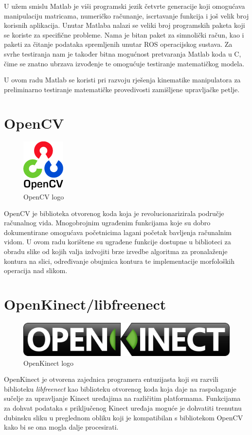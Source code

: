 \documentclass[times, utf8, diplomski, numeric]{fer}
\begin{document}
U užem smislu Matlab je viši programski jezik četvrte generacije koji omogućava manipulaciju matricama, numeričko računanje, iscrtavanje funkcija i još velik broj korisnih aplikacija.
Unutar Matlaba nalazi se veliki broj programskih paketa koji se koriste za specifične probleme.
Nama je bitan paket za simnolički račun, kao i paketi za čitanje podataka spremljenih unutar ROS operacijskog sustava.
Za svrhe testiranja nam je također bitna mogućnost pretvaranja Matlab koda u C, čime se znatno ubrzava izvođenje te omogućuje testiranje matematičkog modela.

U ovom radu Matlab se koristi pri razvoju rješenja kinematike manipulatora za preliminarno testiranje matematičke provedivosti zamišljene upravljačke petlje.

\section{OpenCV}
\begin{figure}[h!]
\centering
\includegraphics[scale=0.6]{logo_opencv}
\caption{OpenCV logo}
\end{figure}
OpenCV je biblioteka otvorenog koda koja je revolucionarizirala područje računalnog vida. Mnogobrojnim ugrađenim funkcijama koje su dobro dokumentirane omogućava početnicima lagani početak bavljenja računalnim vidom. U ovom radu korištene su ugrađene funkcije dostupne u biblioteci za obradu slike od kojih valja izdvojiti brze izvedbe algoritma za pronalaženje kontura na slici, određivanje obujmica kontura te implementacije morfoloških operacija nad slikom.

\section{OpenKinect/libfreenect}
\begin{figure}[H]
\centering
\includegraphics[scale=0.3]{logo_openkinect}
\caption{OpenKinect logo}
\end{figure}
OpenKinect je otvorena zajednica programera entuzijasta koji su razvili biblioteku \textit{libfreenect} kao biblioteku otvorenog koda koja daje na raspolaganje sučelje za upravljanje Kinect uređajima na različitim platformama. Funkcijama za dohvat podataka s priključenog Kinect uređaja moguće je dohvatiti trenutnu dubinsku sliku u preglednom obliku koji je kompatibilan s bibliotekom OpenCV kako bi se ona mogla dalje procesirati.
\end{document}
